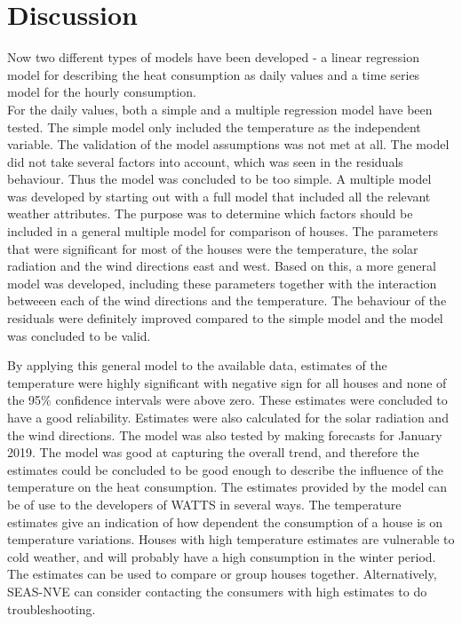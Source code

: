 \chapter{Discussion}
\label{chap: discussion}
Now two different types of models have been developed - a linear regression model for describing the heat consumption as daily values and a time series model for the hourly consumption. \\



\noindent For the daily values, both a simple and a multiple regression model have been tested. The simple model only included the temperature as the independent variable. The validation of the model assumptions was not met at all. The model did not take several factors into account, which was seen in the residuals behaviour. Thus the model was concluded to be too simple. A multiple model was developed by starting out with a full model that included all the relevant weather attributes. The purpose was to determine which factors should be included in a general multiple model for comparison of houses. The parameters that were significant for most of the houses were the temperature, the solar radiation and the wind directions east and west. Based on this, a more general model was developed, including these parameters together with the interaction betweeen each of the wind directions and the temperature. The behaviour of the residuals were definitely improved compared to the simple model and the model was concluded to be valid.

\noindent By applying this general model to the available data, estimates of the temperature were highly significant with negative sign for all houses and none of the 95\% confidence intervals were above zero. These estimates were concluded to have a good reliability. Estimates were also calculated for the solar radiation and the wind directions. The model was also tested by making forecasts for January 2019. The model was good at capturing the overall trend, and therefore the estimates could be concluded to be good enough to describe the influence of the temperature on the heat consumption. The estimates provided by the model can be of use to the developers of WATTS in several ways. The temperature estimates give an indication of how dependent the consumption of a house is on temperature variations. Houses with high temperature estimates are vulnerable to cold weather, and will probably have a high consumption in the winter period. The estimates can be used to compare or group houses together. Alternatively, SEAS-NVE can consider contacting the consumers with high estimates to do troubleshooting.\\

